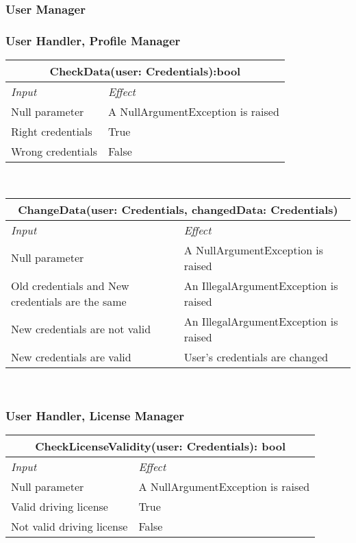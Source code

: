 	\label{sec: individual_steps}
	\subsubsection{User Manager}
		\subsubsection*{User Handler, Profile Manager }
			\begin{tabular}{ |l|l| }
				\hline
				\multicolumn{2}{|c|}{CheckData(user: Credentials):bool}\\
				\hline 
				\textit{Input}&\textit{Effect}\\ \hline
				Null parameter & A NullArgumentException is raised\\ \hline
				Right credentials & True\\ \hline
				Wrong credentials & False\\ \hline
			\end{tabular}
			\\
			\begin{tabular}{ |l|l| }
				\hline
				\multicolumn{2}{|c|}{ChangeData(user: Credentials, changedData: Credentials)}\\
				\hline
				\textit{Input}&\textit{Effect}\\ \hline
				Null parameter & A NullArgumentException is raised\\ \hline
				Old credentials and New credentials are the same & An IllegalArgumentException is raised \\ \hline
				New credentials are not valid & An IllegalArgumentException is raised\\ \hline
				New credentials are valid & User's credentials are changed \\ \hline
			\end{tabular}
			\\		
			
		\subsubsection*{User Handler, License Manager}
			\begin{tabular}{ |l|l| }
				\hline
				\multicolumn{2}{|c|}{CheckLicenseValidity(user: Credentials): bool}\\
				\hline
				\textit{Input}&\textit{Effect}\\ \hline
				Null parameter & A NullArgumentException is raised\\ \hline
				Valid driving license & True\\ \hline
				Not valid driving license & False\\ \hline
			\end{tabular}
			\\
			
